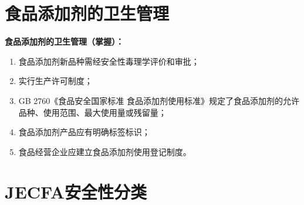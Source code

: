 \section{食品添加剂的卫生管理}

\begin{keybox}
\textbf{食品添加剂的卫生管理（掌握）：}
\begin{enumerate}[leftmargin=*]
    \item 食品添加剂新品种需经安全性毒理学评价和审批；
    \item 实行生产许可制度；
    \item GB 2760《食品安全国家标准 食品添加剂使用标准》规定了食品添加剂的允许品种、使用范围、最大使用量或残留量；
    \item 食品添加剂产品应有明确标签标识；
    \item 食品经营企业应建立食品添加剂使用登记制度。
\end{enumerate}
\end{keybox}

\section{JECFA安全性分类}

